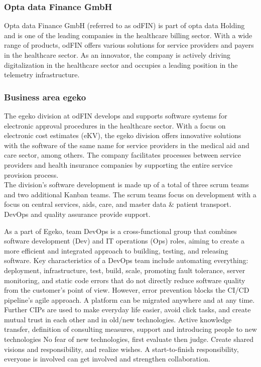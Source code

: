 \subsubsection{Opta data Finance GmbH  }
Opta data Finance GmbH (referred to as odFIN) is part of opta data Holding and is one of the leading companies in the healthcare billing sector. With a wide range of products, odFIN offers various solutions for service providers and payers in the healthcare sector. As an innovator, the company is actively driving digitalization in the healthcare sector and occupies a leading position in the telemetry infrastructure.

\subsubsection{Business area egeko }
The egeko division at odFIN develops and supports software systems for electronic approval procedures in the healthcare sector. With a focus on electronic cost estimates (eKV), the egeko division offers innovative solutions with the software of the same name for service providers in the medical aid and care sector, among others. The company facilitates processes between service providers and health insurance companies by supporting the entire service provision process.\\
The division's software development is made up of a total of three scrum teams and two additional Kanban teams. The scrum teams focus on development with a focus on central services, aids, care, and master data \& patient transport. DevOps and quality assurance provide support.\vspace{.4cm} 

As a part of Egeko, team DevOps is a cross-functional group that combines software development (Dev) and IT operations (Ops) roles, aiming to create a more efficient and integrated approach to building, testing, and releasing software. Key characteristics of a DevOps team include automating everything: deployment, infrastructure, test, build, scale, promoting fault tolerance, server monitoring, and static code errors that do not directly reduce software quality from the customer's point of view. However, error prevention blocks the CI/CD pipeline's agile approach. A platform can be migrated anywhere and at any time. Further CIPs are used to make everyday life easier, avoid click tasks, and create mutual trust in each other and in old/new technologies. Active knowledge transfer, definition of consulting measures, support and introducing people to new technologies No fear of new technologies, first evaluate then judge. Create shared visions and responsibility, and realize wishes. A start-to-finish responsibility, everyone is involved can get involved and strengthen collaboration.\vspace{.4cm}

